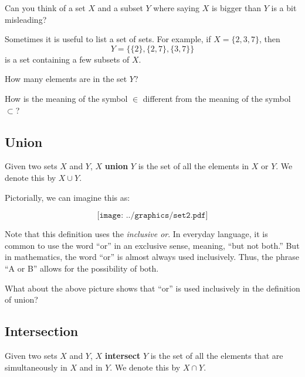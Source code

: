 \begin{question} 
Can you think of a set $X$ and a subset $Y$ where saying $X$ is bigger
than $Y$ is a bit misleading?
\end{question}
\QM

Sometimes it is useful to list a set of sets.  For example, if $X = \{2, 3, 7\}$, then 
$$Y=\{ \{2\}, \{2,7\}, \{3,7\}\}$$
is a set containing a few subsets of $X$.  
\begin{question}
How many elements are in the set $Y$?  
\end{question}
\QM

\begin{question} 
How is the meaning of the symbol $\in$ different from the meaning of
the symbol $\subset$?
\end{question}
\QM

\subsection{Union}
\begin{definition} Given two sets $X$ and $Y$, $X$ \textbf{union} $Y$ is the set of all the elements in $X$ or $Y$. We denote this by $X\cup Y$.  
\end{definition}

Pictorially, we can imagine this as:

\[
\texttt{[image: ../graphics/set2.pdf]}
\]

\begin{warning}
Note that this definition uses the \emph{inclusive or}.  In everyday language, it is common to use the word ``or'' in an exclusive sense, meaning, ``but not both.''  But in mathematics, the word ``or'' is almost always used inclusively.  Thus, the phrase ``A or B'' allows for the possibility of both.
\end{warning}

\begin{question}
What about the above picture shows that ``or'' is used inclusively in the definition of union?  
\end{question}
\QM

\subsection{Intersection}
\begin{definition} Given two sets $X$ and $Y$, 
$X$ \textbf{intersect} $Y$ is the set of all the elements that are simultaneously in $X$ and in $Y$. We denote this by $X\cap Y$. 
\end{definition}

